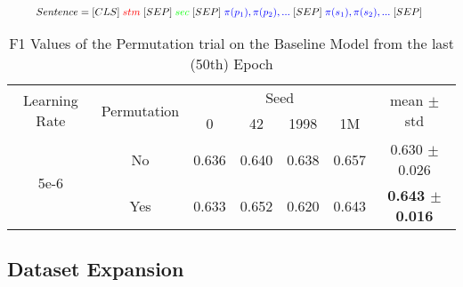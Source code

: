 \begin{equation}
    \resizebox{0.91\hsize}{!}{%
     $Sentence = [CLS] \; \textcolor{red}{stm}\;
                 [SEP] \; \textcolor{green}{sec}\;
                 [SEP] \; \textcolor{blue}{\pi(p_1), \pi(p_2), ... }\;
                 [SEP] \; \textcolor{blue}{\pi(s_1), \pi(s_2), ... }\;
                 [SEP]$      
    }
\end{equation}

\begin{table}[h]
    \centering
    \caption{F1 Values of the Permutation trial on the Baseline Model from the last (50th) Epoch}
    \label{tab:my-table}
    \begin{tabular}{|c|c||cccc|c|}
    \hline
    \multirow{2}{*}{Learning Rate} & \multirow{2}{*}{Permutation} & \multicolumn{4}{c|}{Seed}                                                                    & \multirow{2}{*}{mean $\pm$ std} \\ \cline{3-6}
                                   &                              & \multicolumn{1}{c|}{0}     & \multicolumn{1}{c|}{42}    & \multicolumn{1}{c|}{1998}  & 1M    &                                 \\ \hline \hline
    \multirow{2}{*}{5e-6}          & No                           & \multicolumn{1}{c|}{0.636} & \multicolumn{1}{c|}{0.640} & \multicolumn{1}{c|}{0.638} & 0.657 & 0.630 $\pm$ 0.026               \\ \cline{2-7} 
                                   & Yes                          & \multicolumn{1}{c|}{0.633} & \multicolumn{1}{c|}{0.652} & \multicolumn{1}{c|}{0.620} & 0.643 & \textbf{0.643 $\pm$ 0.016}      \\ \hline
    \end{tabular}
\end{table}














\newpage
\subsection{Dataset Expansion}\label{ch:ds}


